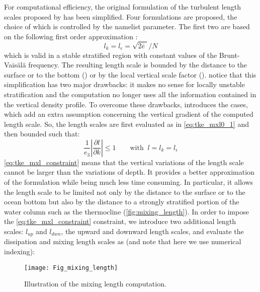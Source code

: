 \documentclass[../main/NEMO_manual]{subfiles}
\begin{document}
For computational efficiency, the original formulation of the turbulent length scales proposed by
\citet{Gaspar1990} has been simplified.
Four formulations are proposed, the choice of which is controlled by the  namelist parameter.
The first two are based on the following first order approximation \citep{Blanke1993}:
\begin{equation}
  \label{eq:tke_mxl0_1}
  l_k = l_\epsilon = \sqrt {2 \bar{e}\; } / N
\end{equation}
which is valid in a stable stratified region with constant values of the Brunt-Vais\"{a}l\"{a} frequency.
The resulting length scale is bounded by the distance to the surface or to the bottom
() or by the local vertical scale factor ().
\citet{Blanke1993} notice that this simplification has two major drawbacks:
it makes no sense for locally unstable stratification and the computation no longer uses all
the information contained in the vertical density profile.
To overcome these drawbacks, \citet{Madec1998} introduces the  cases,
which add an extra assumption concerning the vertical gradient of the computed length scale.
So, the length scales are first evaluated as in \autoref{eq:tke_mxl0_1} and then bounded such that:
\begin{equation}
  \label{eq:tke_mxl_constraint}
  \frac{1}{e_3 }\left| {\frac{\partial l}{\partial k}} \right| \leq 1
  \qquad \text{with }\  l =  l_k = l_\epsilon
\end{equation}
\autoref{eq:tke_mxl_constraint} means that the vertical variations of the length scale cannot be larger than
the variations of depth.
It provides a better approximation of the \citet{Gaspar1990} formulation while being much less 
time consuming.
In particular, it allows the length scale to be limited not only by the distance to the surface or
to the ocean bottom but also by the distance to a strongly stratified portion of the water column such as
the thermocline (\autoref{fig:mixing_length}).
In order to impose the \autoref{eq:tke_mxl_constraint} constraint, we introduce two additional length scales:
$l_{up}$ and $l_{dwn}$, the upward and downward length scales, and
evaluate the dissipation and mixing length scales as
(and note that here we use numerical indexing):
\begin{figure}[!t]
  \begin{center}
    \texttt{[image: Fig\_mixing\_length]}
    \caption{
      \protect\label{fig:mixing_length}
      Illustration of the mixing length computation.
    }
  \end{center}
\end{figure}
\end{document}
